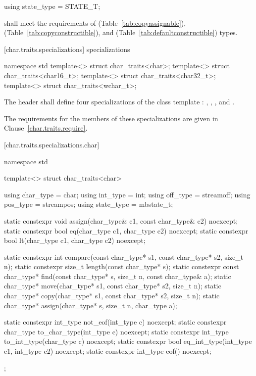 %
\begin{itemdecl}
using state_type = STATE_T;
\end{itemdecl}

\begin{itemdescr}
\pnum
\requires
{}
shall meet the requirements of
 (Table~\ref{tab:copyassignable}),
 (Table~\ref{tab:copyconstructible}), and
 (Table~\ref{tab:defaultconstructible}) types.
\end{itemdescr}

[char.traits.specializations]{ specializations}

%
\begin{codeblock}
namespace std {
  template<> struct char_traits<char>;
  template<> struct char_traits<char16_t>;
  template<> struct char_traits<char32_t>;
  template<> struct char_traits<wchar_t>;
}
\end{codeblock}

\pnum
The header
shall define four
specializations of the class template
:
,
,
,
and
.

\pnum
The requirements for the members of these specializations are given in
Clause~\ref{char.traits.require}.

[char.traits.specializations.char]{}

%
\begin{codeblock}
namespace std {
  template<> struct char_traits<char> {
    using char_type  = char;
    using int_type   = int;
    using off_type   = streamoff;
    using pos_type   = streampos;
    using state_type = mbstate_t;

    static constexpr void assign(char_type& c1, const char_type& c2) noexcept;
    static constexpr bool eq(char_type c1, char_type c2) noexcept;
    static constexpr bool lt(char_type c1, char_type c2) noexcept;

    static constexpr int compare(const char_type* s1, const char_type* s2, size_t n);
    static constexpr size_t length(const char_type* s);
    static constexpr const char_type* find(const char_type* s, size_t n,
                                           const char_type& a);
    static char_type* move(char_type* s1, const char_type* s2, size_t n);
    static char_type* copy(char_type* s1, const char_type* s2, size_t n);
    static char_type* assign(char_type* s, size_t n, char_type a);

    static constexpr int_type not_eof(int_type c) noexcept;
    static constexpr char_type to_char_type(int_type c) noexcept;
    static constexpr int_type to_int_type(char_type c) noexcept;
    static constexpr bool eq_int_type(int_type c1, int_type c2) noexcept;
    static constexpr int_type eof() noexcept;
  };
}
\end{codeblock}


